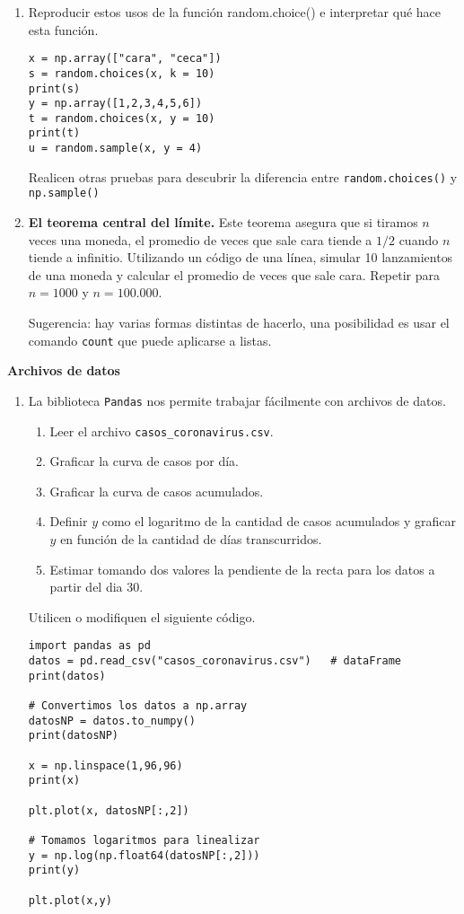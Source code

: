 \documentclass[a4paper,11pt]{article}
\theoremstyle{definition}
\begin{document}
\begin{enumerate}[resume]
\item Reproducir estos usos de la función random.choice() e interpretar qué hace esta función.
\begin{lstlisting}
x = np.array(["cara", "ceca"])
s = random.choices(x, k = 10)
print(s)
y = np.array([1,2,3,4,5,6])
t = random.choices(x, y = 10)
print(t)
u = random.sample(x, y = 4)
\end{lstlisting}

Realicen otras pruebas para descubrir la diferencia entre \lstinline{random.choices()} y \lstinline{np.sample()}

\item {\textbf{El teorema central del límite.}} Este teorema asegura que si tiramos $n$ veces una moneda, el promedio de veces que sale cara tiende a $1/2$ cuando $n$ tiende a infinitio.
Utilizando un código de una línea, simular 10 lanzamientos de una moneda y calcular el promedio de veces que sale cara. Repetir para $n = 1000$ y $n = 100.000$.

Sugerencia: hay varias formas distintas de hacerlo, una posibilidad es usar el comando \lstinline{count} que puede aplicarse a listas.

\end{enumerate}

\textbf{\large Archivos de datos}

\begin{enumerate}[resume]
\item La biblioteca \lstinline{Pandas} nos permite trabajar fácilmente con archivos de datos.

\begin{enumerate}
\item Leer el archivo \lstinline{casos_coronavirus.csv}.
\item Graficar la curva de casos por día.
\item Graficar la curva de casos acumulados.
\item Definir $y$ como el logaritmo de la cantidad de casos acumulados y graficar $y$ en función de la cantidad de días transcurridos.
\item Estimar tomando dos valores la pendiente de la recta para los datos a partir del dia 30.
\end{enumerate}

Utilicen o modifiquen el siguiente código.

\begin{lstlisting}
import pandas as pd
datos = pd.read_csv("casos_coronavirus.csv")   # dataFrame
print(datos)

# Convertimos los datos a np.array
datosNP = datos.to_numpy()
print(datosNP)

x = np.linspace(1,96,96)
print(x)

plt.plot(x, datosNP[:,2])

# Tomamos logaritmos para linealizar
y = np.log(np.float64(datosNP[:,2]))
print(y)

plt.plot(x,y)
\end{lstlisting}

\end{enumerate}
\end{document}
